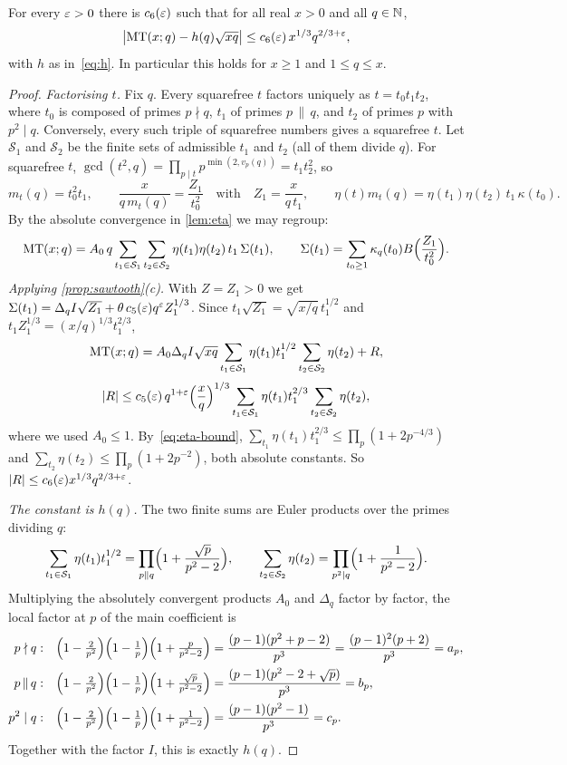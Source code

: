 \begin{proposition}[Asymptotics of $\MT$]\label{prop:MT}
For every $\varepsilon>0$ there is $c_6(\varepsilon)$ such that for all real $x>0$ and all $q\in\mathbb{N}$,
\[
\bigl|\mathrm{MT}(x;q)-h(q)\sqrt{xq}\bigr|\le c_6(\varepsilon)\,x^{1/3}q^{2/3+\varepsilon},
\]
with $h$ as in~\eqref{eq:h}. In particular this holds for $x\ge1$ and $1\le q\le x$.
\end{proposition}

\begin{proof}
\emph{Factorising $t$.} Fix $q$. Every squarefree $t$ factors uniquely as $t=t_0t_1t_2$, where $t_0$ is composed of primes $p\nmid q$, $t_1$ of primes $p\,\|\,q$, and $t_2$ of primes $p$ with $p^2\mid q$. Conversely, every such triple of squarefree numbers gives a squarefree $t$. Let $\mathcal S_1$ and $\mathcal S_2$ be the finite sets of admissible $t_1$ and $t_2$ (all of them divide $q$). For squarefree $t$, $\gcd(t^2,q)=\prod_{p\mid t}p^{\min(2,v_p(q))}=t_1t_2^2$, so
\[
m_t(q)=t_0^2t_1,\qquad\frac x{q\,m_t(q)}=\frac{Z_1}{t_0^2}\quad\text{with}\quad Z_1=\frac{x}{q\,t_1},\qquad \eta(t)m_t(q)=\eta(t_1)\eta(t_2)\,t_1\,\kappa(t_0).
\]
By the absolute convergence in \cref{lem:eta} we may regroup:
\[
\mathrm{MT}(x;q)=A_0\,q\sum_{t_1\in\mathcal S_1}\sum_{t_2\in\mathcal S_2}\eta(t_1)\eta(t_2)\,t_1\,\Sigma(t_1),\qquad\Sigma(t_1)=\sum_{t_0\ge1}\kappa_q(t_0)B\Bigl(\frac{Z_1}{t_0^2}\Bigr).
\]
\emph{Applying \cref{prop:sawtooth}(c).} With $Z=Z_1>0$ we get $\Sigma(t_1)=\Delta_qI\sqrt{Z_1}+\theta\,c_5(\varepsilon)q^\varepsilon Z_1^{1/3}$. Since $t_1\sqrt{Z_1}=\sqrt{x/q}\,t_1^{1/2}$ and $t_1Z_1^{1/3}=(x/q)^{1/3}t_1^{2/3}$,
\[
\mathrm{MT}(x;q)=A_0\Delta_qI\sqrt{xq}\sum_{t_1\in\mathcal S_1}\eta(t_1)t_1^{1/2}\sum_{t_2\in\mathcal S_2}\eta(t_2)+R,
\]
\[
|R|\le c_5(\varepsilon)\,q^{1+\varepsilon}\Bigl(\frac xq\Bigr)^{1/3}\sum_{t_1\in\mathcal S_1}\eta(t_1)t_1^{2/3}\sum_{t_2\in\mathcal S_2}\eta(t_2),
\]
where we used $A_0\le1$. By~\eqref{eq:eta-bound}, $\sum_{t_1}\eta(t_1)t_1^{2/3}\le\prod_p(1+2p^{-4/3})$ and $\sum_{t_2}\eta(t_2)\le\prod_p(1+2p^{-2})$, both absolute constants. So $|R|\le c_6(\varepsilon)x^{1/3}q^{2/3+\varepsilon}$.

\emph{The constant is $h(q)$.} The two finite sums are Euler products over the primes dividing $q$:
\[
\sum_{t_1\in\mathcal S_1}\eta(t_1)t_1^{1/2}=\prod_{p\|q}\Bigl(1+\frac{\sqrt p}{p^2-2}\Bigr),\qquad\sum_{t_2\in\mathcal S_2}\eta(t_2)=\prod_{p^2\mid q}\Bigl(1+\frac1{p^2-2}\Bigr).
\]
Multiplying the absolutely convergent products $A_0$ and $\Delta_q$ factor by factor, the local factor at $p$ of the main coefficient is
\begin{align*}
p\nmid q:&\quad\Bigl(1-\tfrac2{p^2}\Bigr)\Bigl(1-\tfrac1p\Bigr)\Bigl(1+\tfrac p{p^2-2}\Bigr)=\frac{(p-1)(p^2+p-2)}{p^3}=\frac{(p-1)^2(p+2)}{p^3}=a_p,\\
p\,\|\,q:&\quad\Bigl(1-\tfrac2{p^2}\Bigr)\Bigl(1-\tfrac1p\Bigr)\Bigl(1+\tfrac{\sqrt p}{p^2-2}\Bigr)=\frac{(p-1)(p^2-2+\sqrt p)}{p^3}=b_p,\\
p^2\mid q:&\quad\Bigl(1-\tfrac2{p^2}\Bigr)\Bigl(1-\tfrac1p\Bigr)\Bigl(1+\tfrac1{p^2-2}\Bigr)=\frac{(p-1)(p^2-1)}{p^3}=c_p .
\end{align*}
Together with the factor $I$, this is exactly $h(q)$.
\end{proof}

